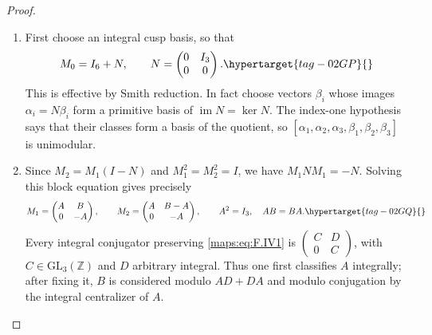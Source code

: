 \documentclass[11pt,a4paper]{article}
\numberwithin{equation}{section}
\theoremstyle{definition}
\begin{document}
\begin{proof}
\begin{enumerate}[label=\arabic*.]
\item First choose an integral cusp basis, so that
\begin{equation}
 M_0=I_6+N,\qquad N=\begin{pmatrix}0&I_3\\0&0\end{pmatrix}.
                                                               \hypertarget{tag-02GP}{}\label{maps:eq:F.IV1}
\end{equation}
This is effective by Smith reduction.  In fact choose vectors
$\beta_i$ whose images $\alpha_i=N\beta_i$ form a primitive
basis of $\operatorname{im}N=\ker N$.
The index-one hypothesis says that their classes form a basis
of the quotient, so $[\alpha_1,\alpha_2,\alpha_3,
\beta_1,\beta_2,\beta_3]$ is unimodular.

\item Since $M_2=M_1(I-N)$ and $M_1^2=M_2^2=I$, we have
$M_1NM_1=-N$.  Solving this block equation gives precisely
\begin{equation}
 M_1=\begin{pmatrix}A&B\\0&-A\end{pmatrix},\qquad
 M_2=\begin{pmatrix}A&B-A\\0&-A\end{pmatrix},\qquad
 A^2=I_3,\quad AB=BA.                                     \hypertarget{tag-02GQ}{}\label{maps:eq:F.IV2}
\end{equation}
Every integral conjugator preserving \eqref{maps:eq:F.IV1} is
$\begin{pmatrix}C&D\\0&C\end{pmatrix}$, with
$C\in\mathrm{GL}_3(\mathbb Z)$ and $D$ arbitrary integral.
Thus one first classifies $A$ integrally; after fixing it,
$B$ is considered modulo $AD+DA$ and modulo conjugation by
the integral centralizer of $A$.


\end{enumerate}
\end{proof}
\end{document}
